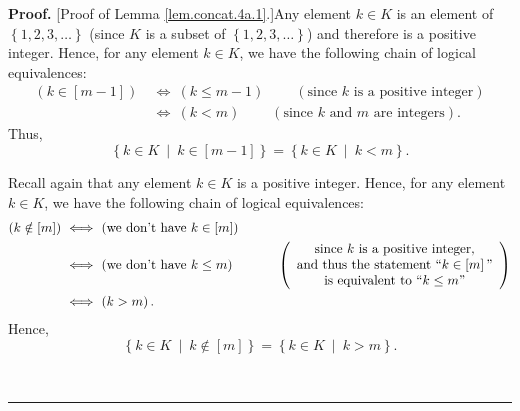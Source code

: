 \documentclass[numbers=enddot,12pt,final,onecolumn,notitlepage]{scrartcl}%
\theoremstyle{definition}
\newenvironment{proof}[1][Proof]{\noindent\textbf{#1.} }{\ \rule{0.5em}{0.5em}}
\begin{document}
\begin{proof}
[Proof of Lemma \ref{lem.concat.4a.1}.]Any element $k\in K$ is an element of
$\left\{  1,2,3,\ldots\right\}  $ (since $K$ is a subset of $\left\{
1,2,3,\ldots\right\}  $) and therefore is a positive integer. Hence, for any
element $k\in K$, we have the following chain of logical equivalences:%
\begin{align*}
\left(  k\in\left[  m-1\right]  \right)  \  &  \Longleftrightarrow\ \left(
k\leq m-1\right)  \ \ \ \ \ \ \ \ \ \ \left(  \text{since }k\text{ is a
positive integer}\right) \\
&  \Longleftrightarrow\ \left(  k<m\right)  \ \ \ \ \ \ \ \ \ \ \left(
\text{since }k\text{ and }m\text{ are integers}\right)  .
\end{align*}
Thus,%
\[
\left\{  k\in K\ \mid\ k\in\left[  m-1\right]  \right\}  =\left\{  k\in
K\ \mid\ k<m\right\}  .
\]


Recall again that any element $k\in K$ is a positive integer. Hence, for any
element $k\in K$, we have the following chain of logical equivalences:%
\begin{align*}
\left(  k\notin\left[  m\right]  \right)  \  &  \Longleftrightarrow\ \left(
\text{we don't have }k\in\left[  m\right]  \right) \\
&  \Longleftrightarrow\ \left(  \text{we don't have }k\leq m\right)
\ \ \ \ \ \ \ \ \ \ \left(
\begin{array}
[c]{c}%
\text{since }k\text{ is a positive integer,}\\
\text{and thus the statement \textquotedblleft}k\in\left[  m\right]
\text{\textquotedblright}\\
\text{is equivalent to \textquotedblleft}k\leq m\text{\textquotedblright}%
\end{array}
\right) \\
&  \Longleftrightarrow\ \left(  k>m\right)  .
\end{align*}
Hence,%
\[
\left\{  k\in K\ \mid\ k\notin\left[  m\right]  \right\}  =\left\{  k\in
K\ \mid\ k>m\right\}  .
\]



\end{proof}
\end{document}
